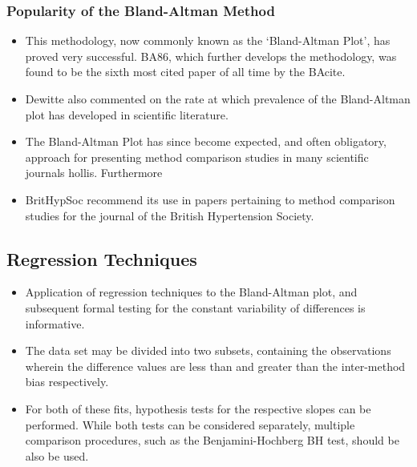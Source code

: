 \documentclass[compress]{beamer}        %
\begin{document}
\begin{frame}
\frametitle{Popularity of the Bland-Altman Method}


\begin{itemize}
\item This methodology, now commonly known as
the `Bland-Altman Plot', has proved very successful.
\alert{BA86}, which further develops the methodology, was found
to be the sixth most cited paper of all time by the
\alert{BAcite}.
\item \alert{Dewitte} also commented on the rate at which
prevalence of the Bland-Altman plot has developed in scientific
literature. 
\item The Bland-Altman Plot has since become expected, and
often obligatory, approach for presenting method comparison
studies in many scientific journals \alert{hollis}. Furthermore
\item \alert{BritHypSoc} recommend its use in papers pertaining to
method comparison studies for the journal of the British
Hypertension Society.
\end{itemize}
\end{frame}

\subsection{Regression Techniques}
\begin{frame}
\begin{itemize}
\item Application of regression techniques to the Bland-Altman plot, and
subsequent formal testing for the constant variability of
differences is informative.
\item  The data set may be divided into two
subsets, containing the observations wherein the difference values
are less than and greater than the inter-method bias respectively.
\item For both of these fits, hypothesis tests for the respective slopes
can be performed. While both tests can be considered separately,
multiple comparison procedures, such as the Benjamini-Hochberg
\alert{BH} test, should be also be used.
\end{itemize}
\end{frame}
\end{document}
